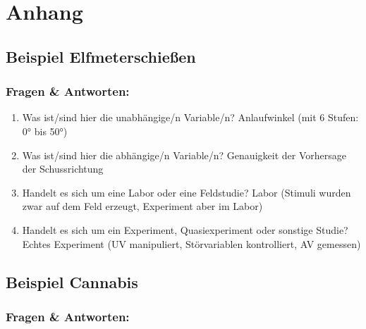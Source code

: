\documentclass[
]{book}
\providecommand{\tightlist}{%
  \setlength{\itemsep}{0pt}\setlength{\parskip}{0pt}}
\begin{document}
\hypertarget{anhang}{%
\section{Anhang}\label{anhang}}

\hypertarget{beispiel-elfmeterschieuxdfen}{%
\subsection{Beispiel Elfmeterschießen}\label{beispiel-elfmeterschieuxdfen}}

\hypertarget{fragen-antworten}{%
\subsubsection{Fragen \& Antworten:}\label{fragen-antworten}}

\begin{enumerate}
\def\labelenumi{\arabic{enumi}.}
\tightlist
\item
  Was ist/sind hier die unabhängige/n Variable/n? \smallskip \newline Anlaufwinkel (mit 6 Stufen: 0° bis 50°) \smallskip \newline
\item
  Was ist/sind hier die abhängige/n Variable/n? \smallskip \newline Genauigkeit der Vorhersage der Schussrichtung \smallskip \newline
\item
  Handelt es sich um eine Labor oder eine Feldstudie? \smallskip \newline Labor (Stimuli wurden zwar auf dem Feld erzeugt, Experiment aber im Labor) \smallskip \newline
\item
  Handelt es sich um ein Experiment, Quasiexperiment oder sonstige Studie? \smallskip \newline Echtes Experiment (UV manipuliert, Störvariablen kontrolliert, AV gemessen)
\end{enumerate}

\hypertarget{beispiel-cannabis}{%
\subsection{Beispiel Cannabis}\label{beispiel-cannabis}}

\hypertarget{fragen-antworten-1}{%
\subsubsection{Fragen \& Antworten:}\label{fragen-antworten-1}}
\end{document}
